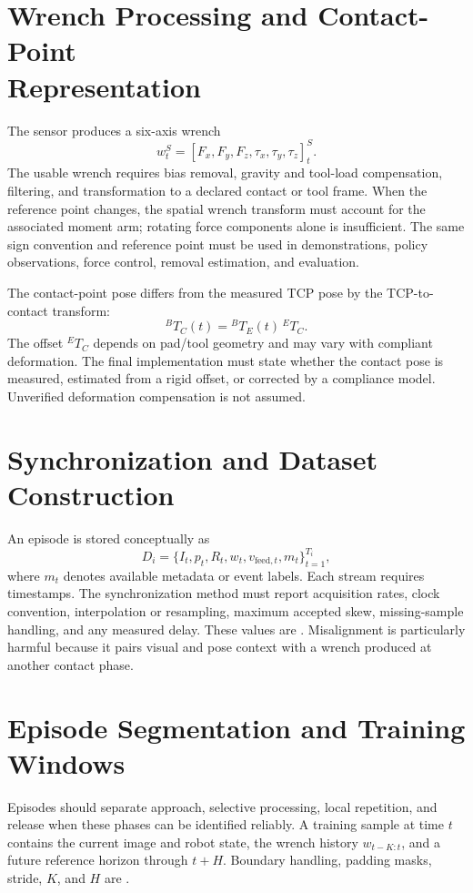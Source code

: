 \section[Wrench Processing and Contact-Point Representation]{Wrench Processing and Contact-Point\\ Representation}
The sensor produces a six-axis wrench
\begin{equation}
  w_t^S=[F_x,F_y,F_z,\tau_x,\tau_y,\tau_z]_t^{S}.
\end{equation}
The usable wrench requires bias removal, gravity and tool-load compensation, filtering, and transformation to a declared contact or tool frame. When the reference point changes, the spatial wrench transform must account for the associated moment arm; rotating force components alone is insufficient. The same sign convention and reference point must be used in demonstrations, policy observations, force control, removal estimation, and evaluation.

The contact-point pose differs from the measured TCP pose by the TCP-to-contact transform:
\begin{equation}
  {}^{B}\!T_C(t)={}^B\!T_E(t)\,{}^E\!T_C.
  \label{eq:contact_pose}
\end{equation}
The offset \({}^E\!T_C\) depends on pad/tool geometry and may vary with compliant deformation. The final implementation must state whether the contact pose is measured, estimated from a rigid offset, or corrected by a compliance model. Unverified deformation compensation is not assumed.

\section{Synchronization and Dataset Construction}
An episode is stored conceptually as
\begin{equation}
  D_i=\{I_t,p_t,R_t,w_t,v_{\mathrm{feed},t},m_t\}_{t=1}^{T_i},
  \label{eq:demonstration_dataset}
\end{equation}
where \(m_t\) denotes available metadata or event labels. Each stream requires timestamps. The synchronization method must report acquisition rates, clock convention, interpolation or resampling, maximum accepted skew, missing-sample handling, and any measured delay. These values are . Misalignment is particularly harmful because it pairs visual and pose context with a wrench produced at another contact phase.

\section{Episode Segmentation and Training Windows}
Episodes should separate approach, selective processing, local repetition, and release when these phases can be identified reliably. A training sample at time \(t\) contains the current image and robot state, the wrench history \(w_{t-K:t}\), and a future reference horizon through \(t+H\). Boundary handling, padding masks, stride, \(K\), and \(H\) are .

